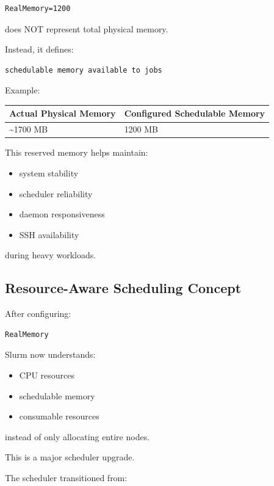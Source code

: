 \documentclass[11pt]{article}
\begin{document}
\begin{verbatim}
RealMemory=1200
\end{verbatim}

does NOT represent total physical memory.

Instead, it defines:

\begin{verbatim}
schedulable memory available to jobs
\end{verbatim}

Example:

\begin{center}
\begin{tabular}{ll}
Actual Physical Memory & Configured Schedulable Memory\\
\hline
\textasciitilde{}1700 MB & 1200 MB\\
\end{tabular}
\end{center}

This reserved memory helps maintain:

\begin{itemize}
\item system stability
\item scheduler reliability
\item daemon responsiveness
\item SSH availability
\end{itemize}

during heavy workloads.
\subsection{Resource-Aware Scheduling Concept}
\label{sec:orgae25f9b}

After configuring:

\begin{verbatim}
RealMemory
\end{verbatim}

Slurm now understands:

\begin{itemize}
\item CPU resources
\item schedulable memory
\item consumable resources
\end{itemize}

instead of only allocating entire nodes.

This is a major scheduler upgrade.

The scheduler transitioned from:
\end{document}

